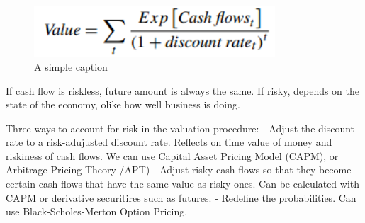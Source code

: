 \begin{figure}[ht!]
\centering
\includegraphics[width=90mm]{figures/formel1-1.png}
\caption{A simple caption \label{overflow}}
\end{figure}

If cash flow is riskless, future amount is always the same. If risky, depends on the state of the economy, olike how well business is doing.

Three ways to account for risk in the valuation procedure:
- Adjust the discount rate to a risk-adujusted discount rate. Reflects on time value of money and riskiness of cash flows. We can use Capital Asset Pricing Model (CAPM), or Arbitrage Pricing Theory /APT)
- Adjust risky cash flows so that they become certain cash flows that have the same value as risky ones. Can be calculated with CAPM or derivative securitires such as futures.
- Redefine the probabilities. Can use Black-Scholes-Merton Option Pricing. 



